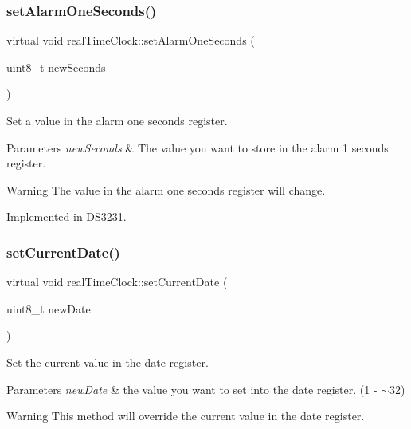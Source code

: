 \subsubsection{\texorpdfstring{set\+Alarm\+One\+Seconds()}{setAlarmOneSeconds()}}
{\footnotesize\ttfamily virtual void real\+Time\+Clock\+::set\+Alarm\+One\+Seconds (\begin{DoxyParamCaption}\item[{uint8\+\_\+t}]{new\+Seconds }\end{DoxyParamCaption})\hspace{0.3cm}{\ttfamily [pure virtual]}}



Set a value in the alarm one seconds register. 


\begin{DoxyParams}{Parameters}
{\em new\+Seconds} & The value you want to store in the alarm 1 seconds register. \\
\hline
\end{DoxyParams}
\begin{DoxyWarning}{Warning}
The value in the alarm one seconds register will change. 
\end{DoxyWarning}


Implemented in \mbox{\hyperlink{class_d_s3231_ae294f3c8c8634a058846cf9864ccc5c8}{D\+S3231}}.

\mbox{\label{classreal_time_clock_a7db563a518ae7b87ca6d77860906e517}} 
\subsubsection{\texorpdfstring{set\+Current\+Date()}{setCurrentDate()}}
{\footnotesize\ttfamily virtual void real\+Time\+Clock\+::set\+Current\+Date (\begin{DoxyParamCaption}\item[{uint8\+\_\+t}]{new\+Date }\end{DoxyParamCaption})\hspace{0.3cm}{\ttfamily [pure virtual]}}



Set the current value in the date register. 


\begin{DoxyParams}{Parameters}
{\em new\+Date} & the value you want to set into the date register. (1 -\/ $\sim$32) \\
\hline
\end{DoxyParams}
\begin{DoxyWarning}{Warning}
This method will override the current value in the date register. 
\end{DoxyWarning}


